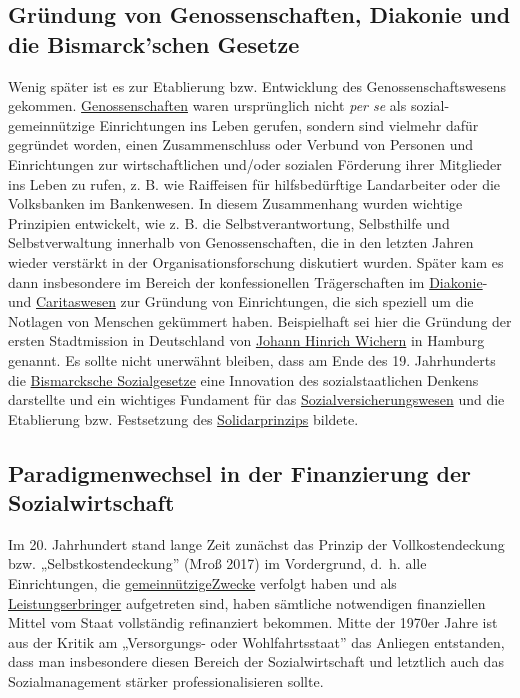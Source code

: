 \documentclass[
  letterpaper,
]{book}
\begin{document}
\subsection{Gründung von Genossenschaften, Diakonie und die
Bismarck'schen Gesetze}\label{gruendung}

Wenig später ist es zur Etablierung bzw. Entwicklung des
Genossenschaftswesens gekommen.
\href{https://de.wikipedia.org/wiki/Genossenschaft}{Genossenschaften}
waren ursprünglich nicht \emph{per se} als sozial-gemeinnützige
Einrichtungen ins Leben gerufen, sondern sind vielmehr dafür gegründet
worden, einen Zusammenschluss oder Verbund von Personen und
Einrichtungen zur wirtschaftlichen und/oder sozialen Förderung ihrer
Mitglieder ins Leben zu rufen, z. B. wie Raiffeisen für hilfsbedürftige
Landarbeiter oder die Volksbanken im Bankenwesen. In diesem Zusammenhang
wurden wichtige Prinzipien entwickelt, wie z. B. die
Selbstverantwortung, Selbsthilfe und Selbstverwaltung innerhalb von
Genossenschaften, die in den letzten Jahren wieder verstärkt in der
Organisationsforschung diskutiert wurden. Später kam es dann
insbesondere im Bereich der konfessionellen Trägerschaften im
\href{https://www.diakonie.de/}{Diakonie}- und
\href{https://www.caritas.de/}{Caritaswesen} zur Gründung von
Einrichtungen, die sich speziell um die Notlagen von Menschen gekümmert
haben. Beispielhaft sei hier die Gründung der ersten Stadtmission in
Deutschland von
\href{https://de.wikipedia.org/wiki/Johann_Hinrich_Wichern}{Johann
Hinrich Wichern} in Hamburg genannt. Es sollte nicht unerwähnt bleiben,
dass am Ende des 19. Jahrhunderts die
\href{https://www.bpb.de/themen/soziale-lage/rentenpolitik/289619/bismarcks-sozialgesetze/}{Bismarcksche
Sozialgesetze} eine Innovation des sozialstaatlichen Denkens darstellte
und ein wichtiges Fundament für das
\href{https://de.wikipedia.org/wiki/Sozialversicherung}{Sozialversicherungswesen}
und die Etablierung bzw. Festsetzung des
\href{https://www.bpb.de/themen/gesundheit/gesundheitspolitik/252319/das-solidarprinzip/}{Solidarprinzips}
bildete.

\subsection{Paradigmenwechsel in der Finanzierung der
Sozialwirtschaft}\label{paradigmenwechsel}

Im 20. Jahrhundert stand lange Zeit zunächst das Prinzip der
Vollkostendeckung bzw. „Selbstkostendeckung'' (Mroß 2017) im
Vordergrund, d.~h. alle Einrichtungen, die
\href{https://www.gesetze-im-internet.de/ao_1977/__52.html\#:~:text=(1)\%20Eine\%20K\%C3\%B6rperschaft\%20verfolgt\%20gemeinn\%C3\%BCtzige,sittlichem\%20Gebiet\%20selbstlos\%20zu\%20f\%C3\%B6rdern.}{gemeinnützigeZwecke}
verfolgt haben und als
\href{https://de.wikipedia.org/wiki/Leistungserbringer}{Leistungserbringer}
aufgetreten sind, haben sämtliche notwendigen finanziellen Mittel vom
Staat vollständig refinanziert bekommen. Mitte der 1970er Jahre ist aus
der Kritik am „Versorgungs- oder Wohlfahrtsstaat'' das Anliegen
entstanden, dass man insbesondere diesen Bereich der Sozialwirtschaft
und letztlich auch das Sozialmanagement stärker professionalisieren
sollte.
\end{document}
